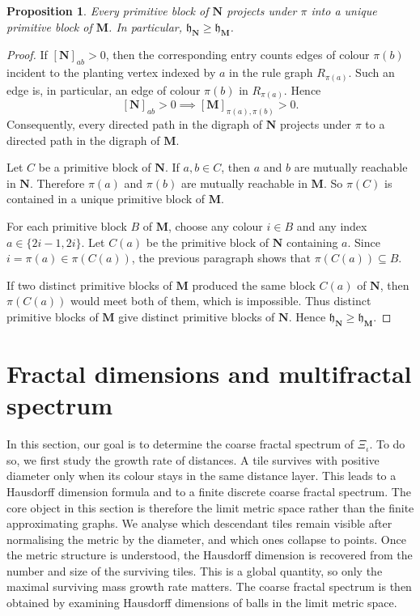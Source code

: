 \documentclass[12pt]{iopart}
\newtheorem{proposition}[theorem]{Proposition}
\begin{document}
\begin{proposition}\label{prop:degree-to-mass}
Every primitive block of $\mathbf N$ projects under $\pi$ into a unique primitive block of $\mathbf M$.
In particular, $\mathfrak h_{\mathbf N} \ge \mathfrak h_{\mathbf M}$.
\end{proposition}

\begin{proof}
If $[\mathbf N]_{ab} > 0$, then the corresponding entry counts edges of colour $\pi(b)$ incident to the planting vertex indexed by $a$ in the rule graph $R_{\pi(a)}$.
Such an edge is, in particular, an edge of colour $\pi(b)$ in $R_{\pi(a)}$.
Hence
\[
[\mathbf N]_{ab} > 0
\implies
[\mathbf M]_{\pi(a),\pi(b)} > 0.
\]
Consequently, every directed path in the digraph of $\mathbf N$ projects under $\pi$ to a directed path in the digraph of $\mathbf M$.

Let $C$ be a primitive block of $\mathbf N$.
If $a,b \in C$, then $a$ and $b$ are mutually reachable in $\mathbf N$.
Therefore $\pi(a)$ and $\pi(b)$ are mutually reachable in $\mathbf M$.
So $\pi(C)$ is contained in a unique primitive block of $\mathbf M$.

For each primitive block $B$ of $\mathbf M$, choose any colour $i \in B$ and any index $a \in \{2i-1,2i\}$.
Let $C(a)$ be the primitive block of $\mathbf N$ containing $a$.
Since $i=\pi(a)\in \pi(C(a))$, the previous paragraph shows that $\pi(C(a)) \subseteq B$.

If two distinct primitive blocks of $\mathbf M$ produced the same block $C(a)$ of $\mathbf N$, then $\pi(C(a))$ would meet both of them, which is impossible.
Thus distinct primitive blocks of $\mathbf M$ give distinct primitive blocks of $\mathbf N$.
Hence $\mathfrak h_{\mathbf N} \ge \mathfrak h_{\mathbf M}$.
\end{proof}









\section{Fractal dimensions and multifractal spectrum}

In this section, our goal is to determine the coarse fractal spectrum of $\Xi_\iota$.
To do so, we first study the growth rate of distances.
A tile survives with positive diameter only when its colour stays in the same distance layer.
This leads to a Hausdorff dimension formula and to a finite discrete coarse fractal spectrum.
The core object in this section is therefore the limit metric space rather than the finite approximating graphs.
We analyse which descendant tiles remain visible after normalising the metric by the diameter, and which ones collapse to points.
Once the metric structure is understood, the Hausdorff dimension is recovered from the number and size of the surviving tiles.
This is a global quantity, so only the maximal surviving mass growth rate matters.
The coarse fractal spectrum is then obtained by examining Hausdorff dimensions of balls in the limit metric space.
\end{document}

